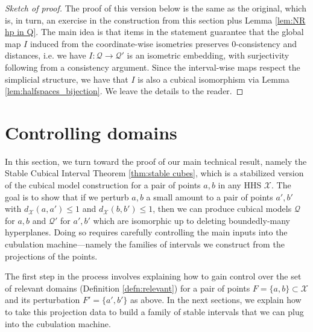 \documentclass{amsart}
\theoremstyle{definition}
\theoremstyle{remark}
\theoremstyle{definition}
\newcommand{\calQ}{\mathcal{Q}}
\newcommand{\calX}{\mathcal{X}}
\begin{document}
\begin{proof}[Sketch of proof]


The proof of this version below is the same as the original, which is, in turn, an exercise in the construction from this section plus Lemma \ref{lem:NR hp in Q}.  The main idea is that items in the statement guarantee that the global map $I$ induced from the coordinate-wise isometries preserves $0$-consistency and distances, i.e. we have $I:\calQ \to \calQ'$ is an isometric embedding, with surjectivity following from a consistency argument.  Since the interval-wise maps respect the simplicial structure, we have that $I$ is also a cubical isomorphism via Lemma \ref{lem:halfspaces_bijection}.  We leave the details to the reader.



\end{proof}
















\section{Controlling domains} \label{sec:controlling domains}

In this section, we turn toward the proof of our main technical result, namely the Stable Cubical Interval Theorem \ref{thm:stable cubes}, which is a stabilized version of the cubical model construction for a pair of points $a,b$ in any HHS $\calX$.  The goal is to show that if we perturb $a,b$ a small amount to a pair of points $a',b'$ with $d_{\calX}(a,a') \leq 1$ and $d_{\calX}(b,b') \leq 1$, then we can produce cubical models $\calQ$ for $a,b$ and $\calQ'$ for $a',b'$ which are isomorphic up to deleting boundedly-many hyperplanes.  Doing so requires carefully controlling the main inputs into the cubulation machine---namely the families of intervals we construct from the projections of the points.

The first step in the process involves explaining how to gain control over the set of relevant domains (Definition \ref{defn:relevant}) for a pair of points $F = \{a,b\} \subset \calX$ and its perturbation $F' = \{a',b'\}$  as above.  In the next sections, we explain how to take this projection data to build a family of stable intervals that we can plug into the cubulation machine.
\end{document}
